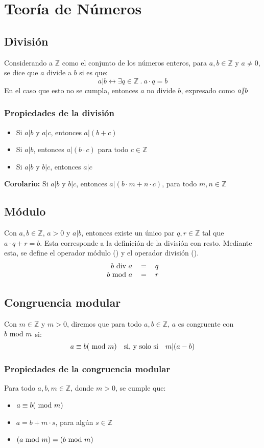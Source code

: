 \documentclass[../main.tex]{subfiles}
\begin{document}
\section{Teoría de Números}
\subsection{División}
Considerando a $\mathds{Z}$ como el conjunto de los números enteros, para $a, b \in \mathds{Z}$ y $a \not= 0$, se dice que $a$ divide a $b$ si es que:
\[ a | b \leftrightarrow \exists q \in \mathds{Z}\ .\ a \cdot q = b \]
En el caso que esto no se cumpla, entonces $a$ no divide $b$, expresado como $a \slashed{|} b$
\subsubsection{Propiedades de la división}
\begin{itemize}
    \item Si $a|b$ y $a|c$, entonces $a|(b + c)$
    \item Si $a|b$, entonces $a|(b \cdot c)$ para todo $c \in \mathds{Z}$
    \item Si $a|b$ y $b|c$, entonces $a|c$
\end{itemize}
\textbf{Corolario:} Si $a|b$ y $b|c$, entonces $a|(b \cdot m + n \cdot c)$, para todo $m, n \in \mathds{Z}$

\subsection{Módulo}
Con $a, b \in \mathds{Z}$, $a > 0$ y $a|b$, entonces existe un único par $q,r \in \mathds{Z}$ tal que
$a \cdot q + r = b$. Esta corresponde a la definición de la división con resto. Mediante esta, se define el operador módulo (\modulo) y el operador división (\division).
\[
    \begin{tabular}{rcl}
        $b \division a$ & $=$ & $q$\\
        $b \modulo a$ & $=$ & $r$
    \end{tabular}
\]

\subsection{Congruencia modular}
Con $m \in \mathds{Z}$ y $m > 0$, diremos que para todo $a,b \in \mathds{Z}$, $a$ es congruente con $b \text{ mod } m$ si:
\[ a \equiv b (\text{ mod } m) \quad \text{si, y solo si} \quad m | (a - b) \]

\subsubsection{Propiedades de la congruencia modular}
Para todo $a,b,m \in \mathds{Z}$, donde $m > 0$, se cumple que:
\begin{itemize}
    \item $a \equiv b (\text{ mod } m)$
    \item $a = b + m \cdot s$, para algún $s \in \mathds{Z}$
    \item $(a \text{ mod } m) = (b \text{ mod } m)$
\end{itemize}
\end{document}
